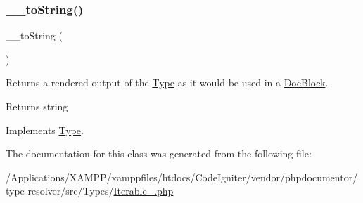 \subsubsection{\texorpdfstring{\+\_\+\+\_\+to\+String()}{\_\_toString()}}
{\footnotesize\ttfamily \+\_\+\+\_\+to\+String (\begin{DoxyParamCaption}{ }\end{DoxyParamCaption})}

Returns a rendered output of the \mbox{\hyperlink{interfacephp_documentor_1_1_reflection_1_1_type}{Type}} as it would be used in a \mbox{\hyperlink{classphp_documentor_1_1_reflection_1_1_doc_block}{Doc\+Block}}.

\begin{DoxyReturn}{Returns}
string 
\end{DoxyReturn}


Implements \mbox{\hyperlink{interfacephp_documentor_1_1_reflection_1_1_type_a7516ca30af0db3cdbf9a7739b48ce91d}{Type}}.



The documentation for this class was generated from the following file\+:\begin{DoxyCompactItemize}
\item 
/\+Applications/\+X\+A\+M\+P\+P/xamppfiles/htdocs/\+Code\+Igniter/vendor/phpdocumentor/type-\/resolver/src/\+Types/\mbox{\hyperlink{_iterable___8php}{Iterable\+\_\+.\+php}}\end{DoxyCompactItemize}
